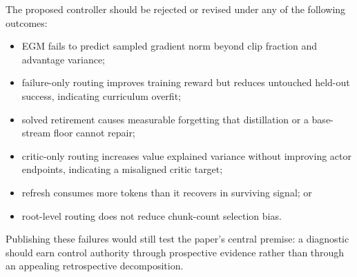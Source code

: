\documentclass{article}
\begin{document}
The proposed controller should be rejected or revised under any of the
following outcomes:
\begin{itemize}[leftmargin=*]
  \item EGM fails to predict sampled gradient norm beyond clip fraction and
  advantage variance;
  \item failure-only routing improves training reward but reduces untouched
  held-out success, indicating curriculum overfit;
  \item solved retirement causes measurable forgetting that distillation or a
  base-stream floor cannot repair;
  \item critic-only routing increases value explained variance without
  improving actor endpoints, indicating a misaligned critic target;
  \item refresh consumes more tokens than it recovers in surviving signal; or
  \item root-level routing does not reduce chunk-count selection bias.
\end{itemize}
Publishing these failures would still test the paper's central premise: a
diagnostic should earn control authority through prospective evidence rather
than through an appealing retrospective decomposition.
\end{document}
